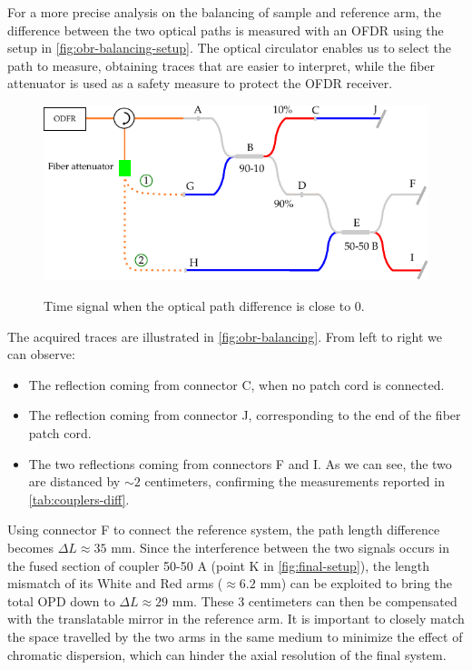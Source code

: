 For a more precise analysis on the balancing of sample and reference arm, the difference between the two optical paths is measured with an OFDR using the setup in \autoref{fig:obr-balancing-setup}. The optical circulator enables us to select the path to measure, obtaining traces that are easier to interpret, while the fiber attenuator is used as a safety measure to protect the OFDR receiver. 

\begin{figure}[tb]
	\myfloatalign
	{	\includegraphics[width=\linewidth]{gfx/ch3/obr-balancing-setup}}
	\caption{Time signal when the optical path difference is close to 0.}\label{fig:obr-balancing-setup}
\end{figure}

The acquired traces are illustrated in \autoref{fig:obr-balancing}. From left to right we can observe:
\begin{itemize}
	
	\item The reflection coming from connector C, when no patch cord is connected.
	\item The reflection coming from connector J, corresponding to the end of the fiber patch cord. 
	
	\item The two reflections coming from connectors F and I. As we can see, the two are distanced by $\sim 2$ centimeters, confirming the measurements reported in \autoref{tab:couplers-diff}. 
\end{itemize}

Using connector F to connect the reference system, the path length difference becomes $\Delta L \approx 35$ mm. Since the interference between the two signals occurs in the fused section of coupler 50-50 A (point K in \autoref{fig:final-setup}), the length mismatch of its White and Red arms ($\approx 6.2$ mm) can be exploited to bring the total \ac{OPD} down to $\Delta L \approx 29$ mm. These 3 centimeters can then be compensated with the translatable mirror in the reference arm. It is important to closely match the space travelled by the two arms in the same medium to minimize the effect of chromatic dispersion, which can hinder the axial resolution of the final system.


